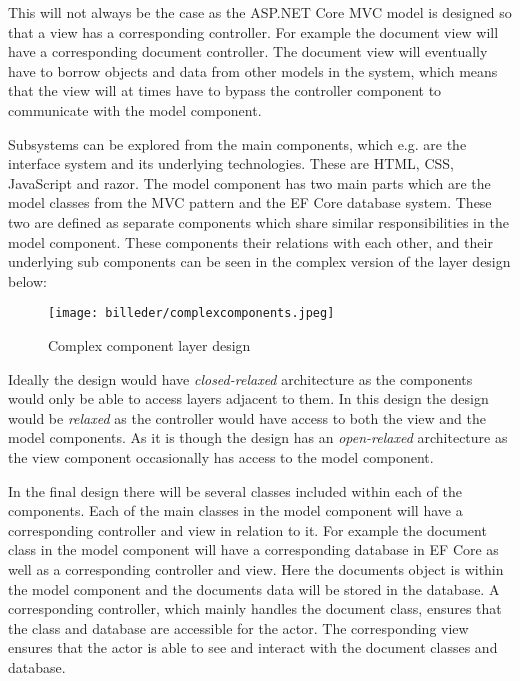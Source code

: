 This will not always be the case as the ASP.NET Core MVC model is designed so that a view has a corresponding controller.
For example the document view will have a corresponding document controller.
The document view will eventually have to borrow objects and data from other models in the system, which means that the view will at times have to bypass the controller component to communicate with the model component.

Subsystems can be explored from the main components, which e.g. are the interface system and its underlying technologies.
These are HTML, CSS, JavaScript and razor.
The model component has two main parts which are the model classes from the MVC pattern and the EF Core database system.
These two are defined as separate components which share similar responsibilities in the model component.
These components their relations with each other, and their underlying sub components can be seen in the complex version of the layer design below:

\begin{figure}[H]
	\centering
	\texttt{[image: billeder/complexcomponents.jpeg]}
	\caption{Complex component layer design}
\end{figure}

Ideally the design would have \textit{closed-relaxed} architecture as the components would only be able to access layers adjacent to them.
In this design the design would be \textit{relaxed} as the controller would have access to both the view and the model components.
As it is though the design has an \textit{open-relaxed} architecture as the view component occasionally has access to the model component.

In the final design there will be several classes included within each of the components.
Each of the main classes in the model component will have a corresponding controller and view in relation to it.
For example the document class in the model component will have a corresponding database in EF Core as well as a corresponding controller and view.
Here the documents object is within the model component and the documents data will be stored in the database.
A corresponding controller, which mainly handles the document class, ensures that the class and database are accessible for the actor.
The corresponding view ensures that the actor is able to see and interact with the document classes and database.
